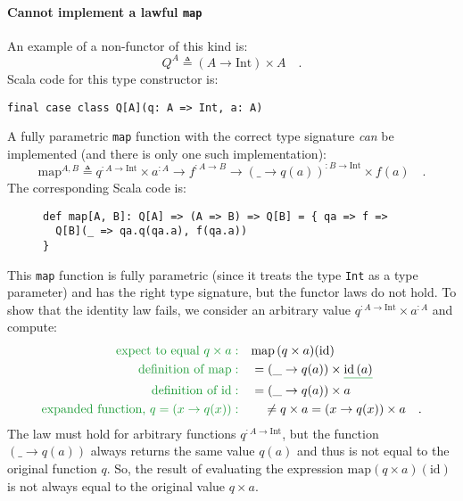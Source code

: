 \paragraph{Cannot implement a lawful \texttt{map}}

An example of a non-functor of this kind is:
\[
Q^{A}\triangleq\left(A\rightarrow\text{Int}\right)\times A\quad.
\]
Scala code for this type constructor is:
\begin{lstlisting}
final case class Q[A](q: A => Int, a: A)
\end{lstlisting}
A fully parametric \lstinline!map! function with the correct type
signature \emph{can} be implemented (and there is only one such implementation):
\[
\text{map}^{A,B}\triangleq q^{:A\rightarrow\text{Int}}\times a^{:A}\rightarrow f^{:A\rightarrow B}\rightarrow(\_\rightarrow q(a))^{:B\rightarrow\text{Int}}\times f(a)\quad.
\]
The corresponding Scala code is:

\begin{wrapfigure}{l}{0.55\columnwidth}%
\vspace{-0.6\baselineskip}

\begin{lstlisting}
def map[A, B]: Q[A] => (A => B) => Q[B] = { qa => f =>
  Q[B](_ => qa.q(qa.a), f(qa.a)) 
}
\end{lstlisting}
\vspace{-0.8\baselineskip}
\end{wrapfigure}%

\noindent This \lstinline!map! function is fully parametric (since
it treats the type \lstinline!Int! as a type parameter) and has the
right type signature, but the functor laws do not hold. To show that
the identity law fails, we consider an arbitrary value $q^{:A\rightarrow\text{Int}}\times a^{:A}$
and compute:
\begin{align*}
{\color{greenunder}\text{expect to equal }q\times a:}\quad & \text{map}\,(q\times a)(\text{id})\\
{\color{greenunder}\text{definition of }\text{map}:}\quad & =(\_\rightarrow q(a))\times\gunderline{\text{id}\,(a)}\\
{\color{greenunder}\text{definition of }\text{id}:}\quad & =(\_\rightarrow q(a))\times a\\
{\color{greenunder}\text{expanded function, }q=\left(x\rightarrow q(x)\right):}\quad & \quad\neq q\times a=(x\rightarrow q(x))\times a\quad.
\end{align*}
The law must hold for arbitrary functions $q^{:A\rightarrow\text{Int}}$,
but the function $\left(\_\rightarrow q(a)\right)$ always returns
the same value $q(a)$ and thus is not equal to the original function
$q$. So, the result of evaluating the expression $\text{map}(q\times a)(\text{id})$
is not always equal to the original value $q\times a$. 

